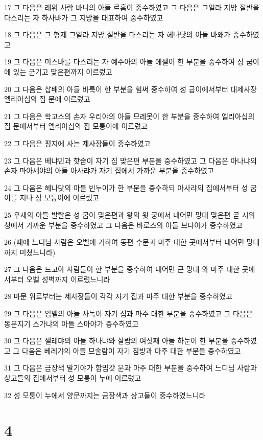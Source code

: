 \par 17 그 다음은 레위 사람 바니의 아들 르훔이 중수하였고 그 다음은 그일라 지방 절반을 다스리는 자 하사뱌가 그 지방을 대표하여 중수하였고
\par 18 그 다음은 그 형제 그일라 지방 절반을 다스리는 자 헤나닷의 아들 바왜가 중수하였고
\par 19 그 다음은 미스바를 다스리는 자 예수아의 아들 에셀이 한 부분을 중수하여 성 굽이에 있는 군기고 맞은편까지 이르렀고
\par 20 그 다음은 삽배의 아들 바룩이 한 부분을 힘써 중수하여 성 굽이에서부터 대제사장 엘리아십의 집 문에 이르렀고
\par 21 그 다음은 학고스의 손자 우리야의 아들 므레못이 한 부분을 중수하여 엘리아십의 집 문에서부터 엘리아십의 집 모퉁이에 이르렀고
\par 22 그 다음은 평지에 사는 제사장들이 중수하였고
\par 23 그 다음은 베냐민과 핫숩이 자기 집 맞은편 부분을 중수하였고 그 다음은 아나냐의 손자 마아세야의 아들 아사랴가 자기 집에서 가까운 부분을 중수하였고
\par 24 그 다음은 헤나닷의 아들 빈누이가 한 부분을 중수하되 아사랴의 집에서부터 성 굽이를 지나 성 모퉁이에 이르렀고
\par 25 우새의 아들 발랄은 성 굽이 맞은편과 왕의 윗 궁에서 내어민 망대 맞은편 곧 시위청에서 가까운 부분을 중수하였고 그 다음은 바로스의 아들 브다야가 중수하였고
\par 26 (때에 느디님 사람은 오벨에 거하여 동편 수문과 마주 대한 곳에서부터 내어민 망대까지 미쳤느니라)
\par 27 그 다음은 드고아 사람들이 한 부분을 중수하여 내어민 큰 망대 와 마주 대한 곳에서부터 오벨 성벽까지 이르렀느니라
\par 28 마문 위로부터는 제사장들이 각각 자기 집과 마주 대한 부분을 중수하였고
\par 29 그 다음은 임멜의 아들 사독이 자기 집과 마주 대한 부분을 중수하였고 그 다음은 동문지기 스가냐의 아들 스마야가 중수하였고
\par 30 그 다음은 셀레먀의 아들 하나냐와 살랍의 여섯째 아들 하눈이 한 부분을 중수하였고 그 다음은 베레갸의 아들 므술람이 자기 침방과 마주 대한 부분을 중수하였고
\par 31 그 다음은 금장색 말기야가 함밉갓 문과 마주 대한 부분을 중수하여 느디님 사람과 상고들의 집에서부터 성 모퉁이 누에 이르렀고
\par 32 성 모퉁이 누에서 양문까지는 금장색과 상고들이 중수하였느니라

\chapter{4}

